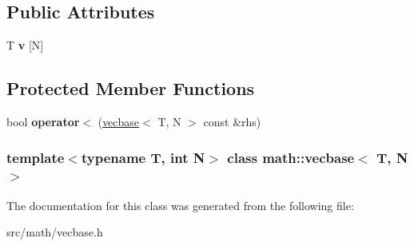\subsection*{Public Attributes}
\begin{DoxyCompactItemize}
\item 
\hypertarget{classmath_1_1vecbase_ae357ff0254aaa64c7e72a93c64726d4c}{
T {\bfseries v} \mbox{[}N\mbox{]}}
\label{classmath_1_1vecbase_ae357ff0254aaa64c7e72a93c64726d4c}

\end{DoxyCompactItemize}
\subsection*{Protected Member Functions}
\begin{DoxyCompactItemize}
\item 
\hypertarget{classmath_1_1vecbase_a277e440413457a2a9431d53cd7eee3e3}{
bool {\bfseries operator$<$} (\hyperlink{classmath_1_1vecbase}{vecbase}$<$ T, N $>$ const \&rhs)}
\label{classmath_1_1vecbase_a277e440413457a2a9431d53cd7eee3e3}

\end{DoxyCompactItemize}
\subsubsection*{template$<$typename T, int N$>$ class math::vecbase$<$ T, N $>$}



The documentation for this class was generated from the following file:\begin{DoxyCompactItemize}
\item 
src/math/vecbase.h\end{DoxyCompactItemize}
